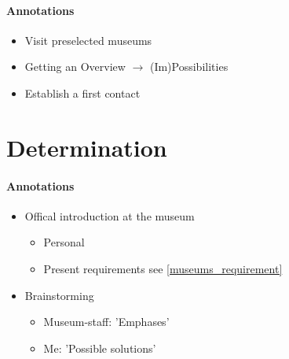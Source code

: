 \paragraph{Annotations}

\begin{itemize}
	\item Visit preselected museums
	\item Getting an Overview $\to$ (Im)Possibilities
	\item Establish a first contact
\end{itemize}



\section{Determination}
\label{museums_determination}

\paragraph{Annotations}

\begin{itemize}
	\item Offical introduction at the museum
	\begin{itemize}
		\item Personal
		\item Present requirements see \ref{museums_requirement}
	\end{itemize}
	\item Brainstorming
	\begin{itemize}
		\item Museum-staff: 'Emphases'
		\item Me: 'Possible solutions'
	\end{itemize}
\end{itemize}
